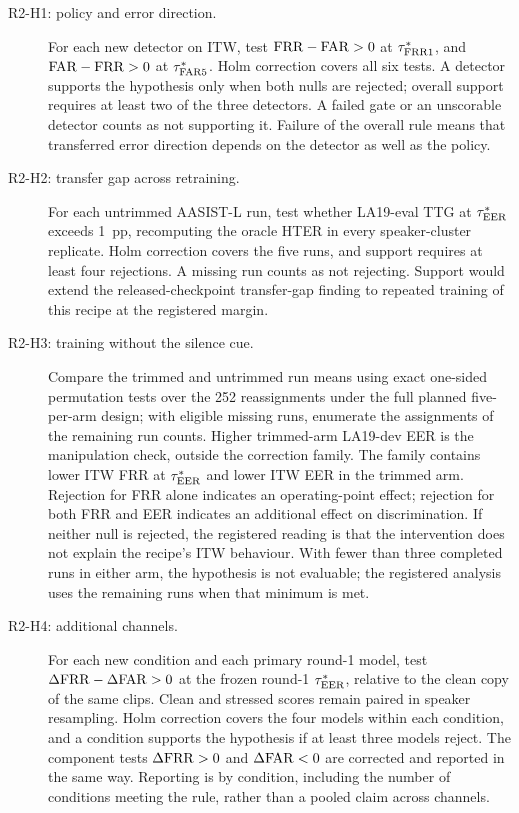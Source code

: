 \begin{description}
\item[R2-H1: policy and error direction.]
For each new detector on ITW, test \(\mathrm{FRR}-\mathrm{FAR}>0\) at \(\tau^{*}_{\mathrm{FRR}1}\), and
\(\mathrm{FAR}-\mathrm{FRR}>0\) at \(\tau^{*}_{\mathrm{FAR}5}\). Holm correction covers all six tests. A detector supports the
hypothesis only when both nulls are rejected; overall support requires at least two of the three
detectors. A failed gate or an unscorable detector counts as not supporting it. Failure of the
overall rule means that transferred error direction depends on the detector as well as the policy.

\item[R2-H2: transfer gap across retraining.]
For each untrimmed AASIST-L run, test whether LA19-eval TTG at \(\tau^{*}_{\mathrm{EER}}\) exceeds 1~pp,
recomputing the oracle HTER in every speaker-cluster replicate. Holm correction covers the five
runs, and support requires at least four rejections. A missing run counts as not rejecting.
Support would extend the released-checkpoint transfer-gap finding to repeated training of this
recipe at the registered margin.

\item[R2-H3: training without the silence cue.]
Compare the trimmed and untrimmed run means using exact one-sided permutation tests over the 252
reassignments under the full planned five-per-arm design; with eligible missing runs, enumerate the assignments
of the remaining run counts. Higher trimmed-arm LA19-dev EER is the manipulation check,
outside the correction family. The family contains lower ITW FRR at \(\tau^{*}_{\mathrm{EER}}\) and lower ITW EER in
the trimmed arm. Rejection for FRR alone indicates an operating-point effect; rejection for both FRR and EER indicates
an additional effect on discrimination. If neither null is rejected, the registered reading
is that the intervention does not explain the recipe's ITW behaviour. With fewer than three completed runs in either arm, the hypothesis is
not evaluable; the registered analysis uses the remaining runs when that minimum is met.

\item[R2-H4: additional channels.]
For each new condition and each primary round-1 model, test
\(\Delta\mathrm{FRR}-\Delta\mathrm{FAR}>0\) at the frozen round-1 \(\tau^{*}_{\mathrm{EER}}\), relative to the clean copy of the
same clips. Clean and stressed scores remain paired in speaker resampling. Holm correction covers
the four models within each condition, and a condition supports the hypothesis if at least three
models reject. The component tests \(\Delta\mathrm{FRR}>0\) and \(\Delta\mathrm{FAR}<0\) are corrected and
reported in the same way. Reporting is by condition, including the number of conditions meeting
the rule, rather than a pooled claim across channels.
\end{description}

